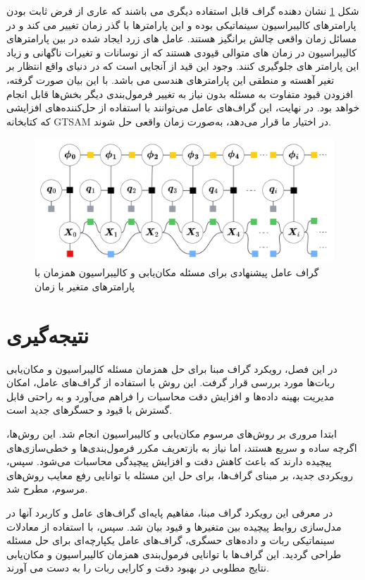 شکل 
\ref{fig:kinematiclocalizationbasicnonstationatyparam}
نشان دهنده گراف قابل استفاده دیگری می باشند که عاری از فرض ثابت بودن پارامترهای کالیبراسیون سینماتیکی بوده و این پارامترها با گذر زمان تغییر می کند و در مسائل زمان واقعی چالش برانگیز هستند. عامل های زرد ایجاد شده در بین پارامترهای کالیبراسیون در زمان های متوالی قیودی هستند که از نوسانات و تغیرات ناگهانی و زیاد این پارامتر های جلوگیری کنند. وجود این قید از آنجایی است که در دنیای واقع انتظار بر تغیر آهسته و منطقی این پارامترهای هندسی می باشد. 
با این بیان صورت گرفته، افزودن قیود متفاوت به مسئله بدون نیاز به تغییر فرمول‌بندی دیگر بخش‌ها قابل انجام خواهد بود. در نهایت، این گراف‌های عامل می‌توانند با استفاده از حل‌کننده‌های افزایشی که کتابخانه GTSAM در اختیار ما قرار می‌دهد، به‌صورت زمان واقعی حل شوند. 

\begin{figure}[b]
	\centering
	\includegraphics[width=0.7\linewidth]{img/Kinematic_localization_basic_nonstationaty_param}
	\caption{گراف عامل پیشنهادی برای مسئله مکان‌یابی و کالیبراسیون همزمان با پارامتر‌های متغیر با زمان}
	\label{fig:kinematiclocalizationbasicnonstationatyparam}
\end{figure}


\section{نتیجه‌گیری}

در این فصل، رویکرد گراف مبنا برای حل همزمان مسئله کالیبراسیون و مکان‌یابی ربات‌ها مورد بررسی قرار گرفت. این روش با استفاده از گراف‌های عامل، امکان مدیریت بهینه داده‌ها و افزایش دقت محاسبات را فراهم می‌آورد و به راحتی قابل گسترش با قیود و حسگرهای جدید است.

ابتدا مروری بر روش‌های مرسوم مکان‌یابی و کالیبراسیون انجام شد. این روش‌ها، اگرچه ساده و سریع هستند، اما نیاز به بازتعریف مکرر فرمول‌بندی‌ها و خطی‌سازی‌های پیچیده دارند که باعث کاهش دقت و افزایش پیچیدگی محاسبات می‌شود. سپس، رویکردی جدید، بر مبنای گراف‌ها، برای حل این مسئله با توانایی رفع معایب روش‌های مرسوم، مطرح شد.

در معرفی این رویکرد گراف مبنا، مفاهیم پایه‌ای گراف‌های عامل و کاربرد آنها در مدل‌سازی روابط پیچیده بین متغیرها و قیود بیان شد. سپس، با استفاده از معادلات سینماتیکی ربات و داده‌های حسگری، گراف‌های عامل یکپارچه‌ای برای حل مسئله طراحی گردید. این گراف‌ها با توانایی فرمول‌بندی همزمان کالیبراسیون و مکان‌یابی نتایج مطلوبی در بهبود دقت و کارایی ربات را به دست می آورند.



 
 
 
 